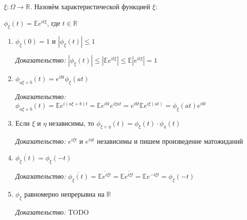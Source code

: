 \begin{definition}
    $\xi : \Omega \to \mathbb{R}$. Назовём характеристической функцией $\xi$:

    $\phi_\xi (t) = \mathbb{E} e^{it\xi}$, где $t \in \mathbb{R}$
\end{definition}

\begin{properties}
    \begin{enumerate}
        \item {
            $\phi_\xi (0) = 1$ и $|\phi_\xi (t)| \leqslant 1$

            \textit{Доказательство: } $|\phi_\xi (t)| \leqslant |\mathbb{E} e^{it\xi}| \leqslant \mathbb{E}|e^{it\xi}| = 1$
        }
        \item {
            $\phi_{a\xi + b} (t) = e^{ibt} \phi_\xi (at)$

            \textit{Доказательство: } $\phi_{a\xi + b} (t) = \mathbb{E} e^{i(a \xi + b)t} = \mathbb{E} e^{ibt} e^{i\xi a t} = e^{ibt} \mathbb{E} e^{i\xi (at)} = \phi_{\xi} (at) e^{ibt} $
        }
        \item {
            Если $\xi$ и $\eta$ независимы, то $\phi_{\xi + \eta} (t) = \phi_\xi (t) \cdot \phi_{\eta} (t)$

            \textit{Доказательство: } $e^{i\xi t}$ и $e^{i \eta t}$ независимы и пишем произведение матожиданий
        }
        \item {
            $\overline{\phi_{\xi}(t)} = \phi_{\xi} (-t)$

            \textit{Доказательство: } $\overline{\phi_{\xi}(t)} = \overline{\mathbb{E} e^{i \xi t}} = \mathbb{E} \overline{e^{i \xi t}} = \mathbb{E} e^{-i \xi t} = \phi_\xi (-t)$
        }
        \item {
            $\phi_{\xi}$ равномерно непрерывна на $\mathbb{R}$

            \textit{Доказательство: } TODO %

        }
    \end{enumerate}
\end{properties}

